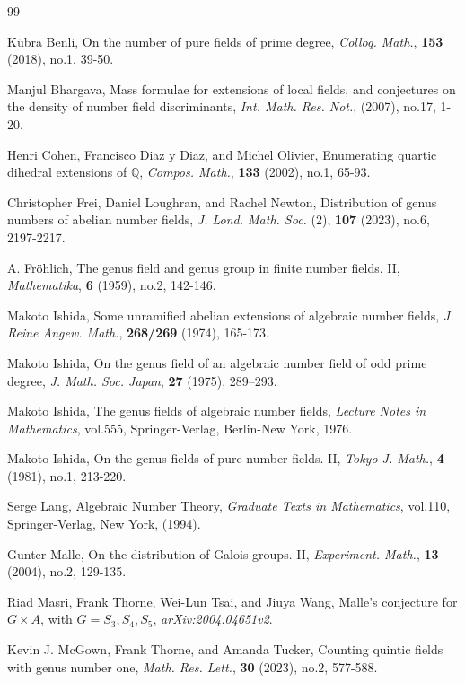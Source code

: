 \documentclass[11pt,reqno]{amsart}
\newcommand{\Q}{\mathbb{Q}}
\theoremstyle{definition}
\theoremstyle{remark}
\begin{document}
\begin{thebibliography}{99}
	
	K\"ubra Benli,
	On the number of pure fields of prime degree,
	\textit{Colloq. Math.}, \textbf{153} (2018), no.1, 39-50.
	
	Manjul Bhargava,
	Mass formulae for extensions of local fields, and conjectures on the density of number field discriminants,
	\textit{Int. Math. Res. Not.}, (2007), no.17, 1-20.
	
	Henri Cohen, Francisco Diaz y Diaz, and Michel Olivier,
	Enumerating quartic dihedral extensions of $\Q$,
	\textit{Compos. Math.}, \textbf{133} (2002), no.1, 65-93.
	
	Christopher Frei, Daniel Loughran, and Rachel Newton,
	Distribution of genus numbers of abelian number fields,
	\textit{J. Lond. Math. Soc.} (2), \textbf{107} (2023), no.6, 2197-2217.
	
	A. Fr\"ohlich,
	The genus field and genus group in finite number fields. II,
	\textit{Mathematika}, \textbf{6} (1959), no.2, 142-146.
	
	Makoto Ishida,
	Some unramified abelian extensions of algebraic number fields,
	\textit{J. Reine Angew. Math.}, \textbf{268/269} (1974), 165-173.
	
	Makoto Ishida,
	On the genus field of an algebraic number field of odd prime degree,
	\textit{J. Math. Soc. Japan}, \textbf{27} (1975), 289--293.
	
	Makoto Ishida,
	The genus fields of algebraic number fields,
	\textit{Lecture Notes in Mathematics}, vol.555,
	Springer-Verlag, Berlin-New York, 1976.
	
	Makoto Ishida,
	On the genus fields of pure number fields. II,
	\textit{Tokyo J. Math.}, \textbf{4} (1981), no.1, 213-220.
	
	Serge Lang,
	Algebraic Number Theory,
	\textit{Graduate Texts in Mathematics}, vol.110,
	Springer-Verlag, New York, (1994).
	
	Gunter Malle,
	On the distribution of Galois groups. II,
	\textit{Experiment. Math.}, \textbf{13} (2004), no.2, 129-135.
	
	Riad Masri, Frank Thorne, Wei-Lun Tsai, and Jiuya Wang,
	Malle's conjecture for $G \times A$, with $G = S_3, S_4, S_5$,
	\textit{arXiv:2004.04651v2}.
	
	Kevin J. McGown, Frank Thorne, and Amanda Tucker,
	Counting quintic fields with genus number one,
	\textit{Math. Res. Lett.}, \textbf{30} (2023), no.2, 577-588.
	

\end{thebibliography}
\end{document}
